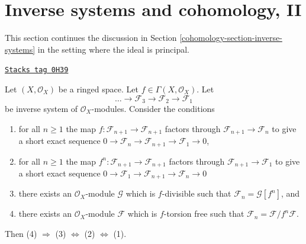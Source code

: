 \section{Inverse systems and cohomology, II}
\label{cohomology-section-inverse-systems-bis}
This section continues the discussion in
Section \ref{cohomology-section-inverse-systems}
in the setting where the ideal is principal.

\begin{lemma}
\label{cohomology-lemma-equivalent-f-good}
\href{https://stacks.math.columbia.edu/tag/0H39}{\texttt{Stacks tag 0H39}}

Let $(X, \mathcal{O}_X)$ be a ringed space.
Let $f \in \Gamma(X, \mathcal{O}_X)$. Let
$$
\ldots \to \mathcal{F}_3 \to \mathcal{F}_2 \to \mathcal{F}_1
$$
be inverse system of $\mathcal{O}_X$-modules. Consider the conditions
\begin{enumerate}
\item for all $n \geq 1$ the map
$f : \mathcal{F}_{n + 1} \to \mathcal{F}_{n + 1}$ factors
through $\mathcal{F}_{n + 1} \to \mathcal{F}_n$ to give a
short exact sequence
$0 \to \mathcal{F}_n \to \mathcal{F}_{n + 1} \to \mathcal{F}_1 \to 0$,
\item for all $n \geq 1$ the map
$f^n : \mathcal{F}_{n + 1} \to \mathcal{F}_{n + 1}$
factors through $\mathcal{F}_{n + 1} \to \mathcal{F}_1$
to give a short exact sequence
$0 \to \mathcal{F}_1 \to \mathcal{F}_{n + 1} \to \mathcal{F}_n \to 0$
\item there exists an $\mathcal{O}_X$-module $\mathcal{G}$
which is $f$-divisible such that $\mathcal{F}_n = \mathcal{G}[f^n]$, and
\item there exists an $\mathcal{O}_X$-module $\mathcal{F}$
which is $f$-torsion free such that
$\mathcal{F}_n = \mathcal{F}/f^n\mathcal{F}$.
\end{enumerate}
Then (4) $\Rightarrow$ (3) $\Leftrightarrow$ (2) $\Leftrightarrow$ (1).
\end{lemma}

